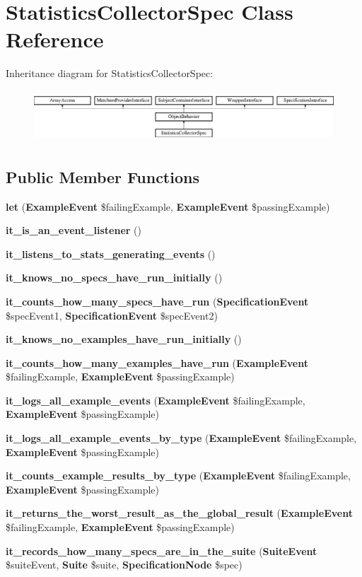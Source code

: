 \section{Statistics\+Collector\+Spec Class Reference}
\label{classspec_1_1_php_spec_1_1_listener_1_1_statistics_collector_spec}
Inheritance diagram for Statistics\+Collector\+Spec\+:\begin{figure}[H]
\begin{center}
\leavevmode
\includegraphics[height=1.953488cm]{classspec_1_1_php_spec_1_1_listener_1_1_statistics_collector_spec}
\end{center}
\end{figure}
\subsection*{Public Member Functions}
\begin{DoxyCompactItemize}
\item 
{\bf let} ({\bf Example\+Event} \$failing\+Example, {\bf Example\+Event} \$passing\+Example)
\item 
{\bf it\+\_\+is\+\_\+an\+\_\+event\+\_\+listener} ()
\item 
{\bf it\+\_\+listens\+\_\+to\+\_\+stats\+\_\+generating\+\_\+events} ()
\item 
{\bf it\+\_\+knows\+\_\+no\+\_\+specs\+\_\+have\+\_\+run\+\_\+initially} ()
\item 
{\bf it\+\_\+counts\+\_\+how\+\_\+many\+\_\+specs\+\_\+have\+\_\+run} ({\bf Specification\+Event} \$spec\+Event1, {\bf Specification\+Event} \$spec\+Event2)
\item 
{\bf it\+\_\+knows\+\_\+no\+\_\+examples\+\_\+have\+\_\+run\+\_\+initially} ()
\item 
{\bf it\+\_\+counts\+\_\+how\+\_\+many\+\_\+examples\+\_\+have\+\_\+run} ({\bf Example\+Event} \$failing\+Example, {\bf Example\+Event} \$passing\+Example)
\item 
{\bf it\+\_\+logs\+\_\+all\+\_\+example\+\_\+events} ({\bf Example\+Event} \$failing\+Example, {\bf Example\+Event} \$passing\+Example)
\item 
{\bf it\+\_\+logs\+\_\+all\+\_\+example\+\_\+events\+\_\+by\+\_\+type} ({\bf Example\+Event} \$failing\+Example, {\bf Example\+Event} \$passing\+Example)
\item 
{\bf it\+\_\+counts\+\_\+example\+\_\+results\+\_\+by\+\_\+type} ({\bf Example\+Event} \$failing\+Example, {\bf Example\+Event} \$passing\+Example)
\item 
{\bf it\+\_\+returns\+\_\+the\+\_\+worst\+\_\+result\+\_\+as\+\_\+the\+\_\+global\+\_\+result} ({\bf Example\+Event} \$failing\+Example, {\bf Example\+Event} \$passing\+Example)
\item 
{\bf it\+\_\+records\+\_\+how\+\_\+many\+\_\+specs\+\_\+are\+\_\+in\+\_\+the\+\_\+suite} ({\bf Suite\+Event} \$suite\+Event, {\bf Suite} \$suite, {\bf Specification\+Node} \$spec)
\end{DoxyCompactItemize}

